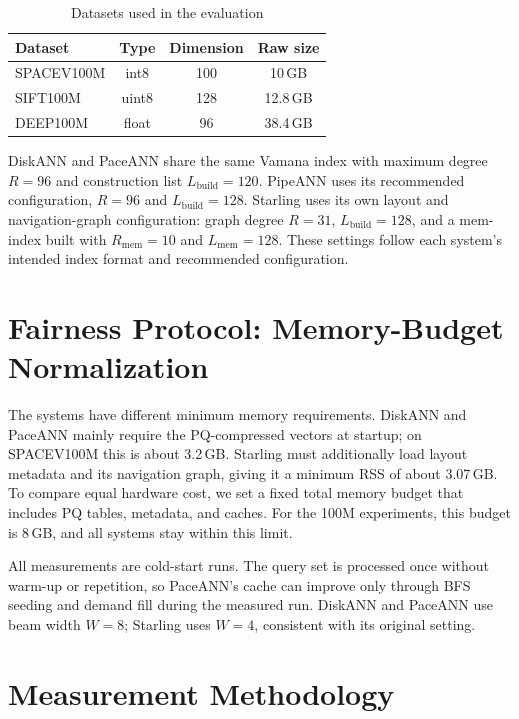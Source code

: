 \begin{table}[h]
\centering
\caption[Evaluation datasets]{Datasets used in the evaluation}
\label{tab:datasets}
\begin{tabular}{lccc}
\toprule
Dataset & Type & Dimension & Raw size \\
\midrule
SPACEV100M & int8   & 100 & 10\,GB   \\
SIFT100M   & uint8  & 128 & 12.8\,GB \\
DEEP100M   & float  & 96  & 38.4\,GB \\
\bottomrule
\end{tabular}
\end{table}

DiskANN and PaceANN share the same Vamana index with maximum degree $R=96$ and construction list $L_\text{build}=120$.
PipeANN uses its recommended configuration, $R=96$ and $L_\text{build}=128$.
Starling uses its own layout and navigation-graph configuration: graph degree $R=31$, $L_\text{build}=128$, and a mem-index built with $R_\text{mem}=10$ and $L_\text{mem}=128$.
These settings follow each system's intended index format and recommended configuration.

\section{Fairness Protocol: Memory-Budget Normalization}
\label{sec:fairness}

The systems have different minimum memory requirements.
DiskANN and PaceANN mainly require the PQ-compressed vectors at startup; on SPACEV100M this is about 3.2\,GB.
Starling must additionally load layout metadata and its navigation graph, giving it a minimum RSS of about 3.07\,GB.
To compare equal hardware cost, we set a fixed total memory budget that includes PQ tables, metadata, and caches.
For the 100M experiments, this budget is 8\,GB, and all systems stay within this limit.

All measurements are cold-start runs.
The query set is processed once without warm-up or repetition, so PaceANN's cache can improve only through BFS seeding and demand fill during the measured run.
DiskANN and PaceANN use beam width $W=8$; Starling uses $W=4$, consistent with its original setting.

\section{Measurement Methodology}
\label{sec:measurement}

